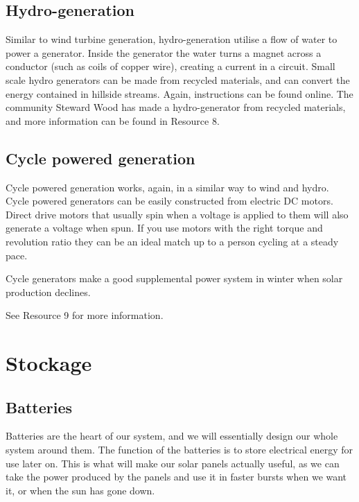 \documentclass{article}
\theoremstyle{definition}
\theoremstyle{definition}
\theoremstyle{remark}
\begin{document}
  {\color{blue}\subsection{Hydro-generation}} %
  \label{sub:hydro_generation}

    Similar to wind turbine generation, hydro-generation utilise a flow of water to power a generator. Inside the generator the water turns a magnet across a conductor (such as coils of copper wire), creating a current in a circuit. Small scale hydro generators can be made from recycled materials, and can convert the energy contained in hillside streams. Again, instructions can be found online. The community Steward Wood has made a hydro-generator from recycled materials, and more information can be found in Resource 8.
  

  {\color{blue}\subsection{Cycle powered generation}} %
  \label{sub:cycle_powered_generation}

    Cycle powered generation works, again, in a similar way to wind and hydro. Cycle powered generators can be easily constructed from electric DC motors. Direct drive motors that usually spin when a voltage is applied to them will also generate a voltage when spun. If you use motors with the right torque and revolution ratio they can be an ideal match up to a person cycling at a steady pace.

    Cycle generators make a good supplemental power system in winter when solar production declines.

    See Resource 9 for more information.
  


{\color{blue}\section{Stockage}} %
\label{sec:stockage}

  {\color{blue}\subsection{Batteries}} %
  \label{sub:batteries}

    Batteries are the heart of our system, and we will essentially design our whole system around them. The function of the batteries is to store electrical energy for use later on. This is what will make our solar panels actually useful, as we can take the power produced by the panels and use it in faster bursts when we want it, or when the sun has gone down. 
\end{document}
